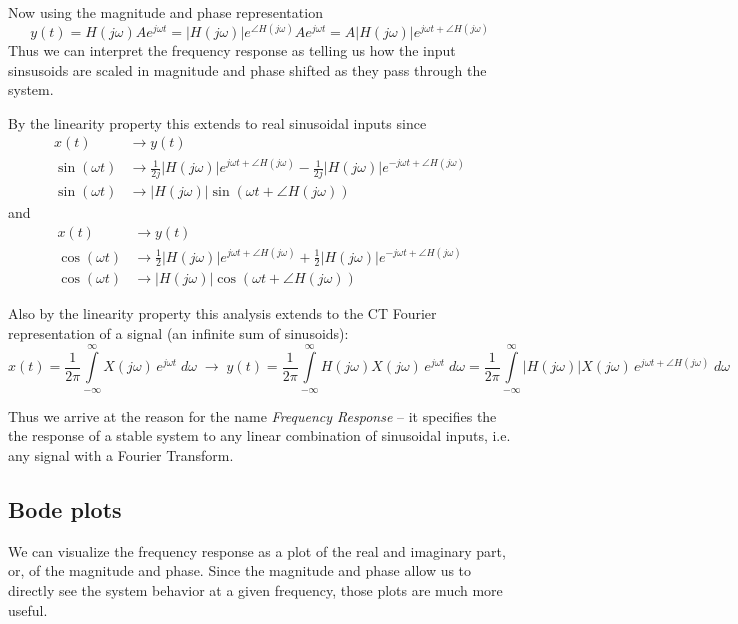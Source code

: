 Now using the magnitude and phase representation
\[
y(t) = H(j\omega) A e^{j\omega t} = |H(j\omega)|e^{\angle H(j\omega)} A e^{j\omega t} = A |H(j\omega)| e^{j\omega t + \angle H(j\omega)} 
\]
Thus we can interpret the frequency response as telling us how the input sinsusoids are scaled in magnitude and phase shifted as they pass through the system.

By the linearity property this extends to real sinusoidal inputs since
\begin{align*}
  x(t) &\longrightarrow y(t)\\
  \sin(\omega t) &\longrightarrow \frac{1}{2j}|H(j\omega)| e^{j\omega t + \angle H(j\omega)} - \frac{1}{2j}|H(j\omega)| e^{-j\omega t + \angle H(j\omega)}\\
  \sin(\omega t) &\longrightarrow |H(j\omega)|\sin(\omega t + \angle H(j\omega))  
\end{align*}
and
\begin{align*}
  x(t) &\longrightarrow y(t)\\
  \cos(\omega t) &\longrightarrow \frac{1}{2}|H(j\omega)| e^{j\omega t + \angle H(j\omega)} + \frac{1}{2}|H(j\omega)| e^{-j\omega t + \angle H(j\omega)}\\
  \cos(\omega t) &\longrightarrow |H(j\omega)|\cos(\omega t + \angle H(j\omega))  
\end{align*}

Also by the linearity property this analysis extends to the CT Fourier representation of a signal (an infinite sum of sinusoids):
\[
x(t) = \frac{1}{2\pi}\int\limits_{-\infty}^{\infty} X(j \omega) \, e^{j \omega t}\; d\omega \;\longrightarrow\; y(t) = \frac{1}{2\pi}\int\limits_{-\infty}^{\infty} H(j \omega) X(j \omega) \, e^{j \omega t}\; d\omega = \frac{1}{2\pi}\int\limits_{-\infty}^{\infty} \left| H(j \omega)\right| X(j \omega) \, e^{j \omega t + \angle H(j \omega)}\; d\omega
\]

Thus we arrive at the reason for the name \textit{Frequency Response} -- it specifies the the response of a stable system to any linear combination of sinusoidal inputs, i.e. any signal with a Fourier Transform.


\subsection{Bode plots}

We can visualize the frequency response as a plot of the real and imaginary part, or, of the magnitude and phase. Since the magnitude and phase allow us to directly see the system behavior at a given frequency, those plots are much more useful.

